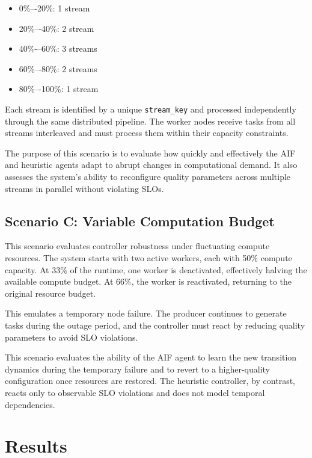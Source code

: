 \begin{itemize}
    \item 0\%–-20\%: 1 stream
    \item 20\%–-40\%: 2 stream
    \item 40\%-–60\%: 3 streams
    \item 60\%–-80\%: 2 streams
    \item 80\%–-100\%: 1 stream
\end{itemize}

Each stream is identified by a unique \texttt{stream\_key} and processed independently through the same distributed pipeline. The worker nodes receive tasks from all streams interleaved and must process them within their capacity constraints.

The purpose of this scenario is to evaluate how quickly and effectively the AIF and heuristic agents adapt to abrupt changes in computational demand. It also assesses the system’s ability to reconfigure quality parameters across multiple streams in parallel without violating SLOs.

\subsection{Scenario C: Variable Computation Budget}
\label{sec:evaluation-variable-budget}

This scenario evaluates controller robustness under fluctuating compute resources. The system starts with two active workers, each with 50\% compute capacity. At 33\% of the runtime, one worker is deactivated, effectively halving the available compute budget. At 66\%, the worker is reactivated, returning to the original resource budget.

This emulates a temporary node failure. The producer continues to generate tasks during the outage period, and the controller must react by reducing quality parameters to avoid SLO violations.

This scenario evaluates the ability of the AIF agent to learn the new transition dynamics during the temporary failure and to revert to a higher-quality configuration once resources are restored. The heuristic controller, by contrast, reacts only to observable SLO violations and does not model temporal dependencies.

\section{Results}


